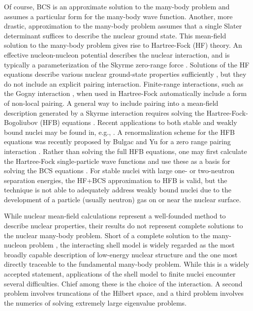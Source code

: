 \documentclass[preprint,rmp,aps,floatfix]{revtex4}
\begin{document}
Of course, BCS is an approximate solution to the many-body problem
and assumes a particular form for the many-body wave function. Another,
more drastic, approximation to the many-body problem 
assumes that a single Slater determinant
suffices to describe the nuclear ground state. This mean-field 
solution to the many-body problem gives rise to 
Hartree-Fock (HF) theory. An effective nucleon-nucleon 
potential describes the nuclear interaction, and is
typically a parameterization of the Skyrme zero-range force \cite{sk_56,sk_59}.
Solutions of the HF equations 
describe various nuclear ground-state properties sufficiently \cite{qf_78}, 
but they do not include an explicit pairing interaction. 
Finite-range interactions, such as
the Gogny interaction \cite{dgg_75}, when used in Hartree-Fock
automatically include a form of non-local pairing. 
A general way to include pairing into a mean-field 
description generated by a Skyrme interaction requires solving the 
Hartree-Fock-Bogoliubov (HFB) equations \cite{bog_58}. Recent
applications to both stable and weakly bound nuclei
may be found in, e.g., \cite{dob_96,heenen_2002b,heenen_2002a}. 
A renormalization scheme for the HFB equations 
was recently proposed by Bulgac and Yu for a zero range pairing interaction
\cite{aurel2001a,aurel2001b}.  
Rather than solving the full HFB equations, one may first
calculate the Hartree-Fock single-particle wave functions and
use these as a basis for solving the BCS equations \cite{tondeur_79,
nayak_95}.  
For stable nuclei with large one- or two-neutron 
separation energies, the HF+BCS approximation to HFB is valid, but
the technique is not able to adequately address weakly bound nuclei
due to the development of a particle (usually neutron) gas on or
near the nuclear surface. 

While nuclear mean-field calculations represent a well-founded 
method to describe nuclear properties, their results do not
represent complete solutions to the nuclear many-body problem. 
Short of a complete solution to the many-nucleon problem \cite{Vijay}, the
interacting shell model is widely regarded as the most broadly capable
description of low-energy nuclear structure and the one most 
directly traceable to the fundamental many-body problem. While
this is a widely accepted statement, applications of the shell model 
to finite nuclei encounter several difficulties. Chief among these
is the choice of the interaction. A second problem involves 
truncations of the Hilbert space, and a third problem involves 
the numerics of solving extremely large eigenvalue problems. 
\end{document}
